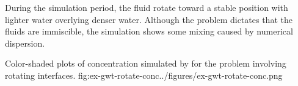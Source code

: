 During the simulation period, the fluid rotate toward a stable position with lighter water overlying denser water.  Although the problem dictates that the fluids are immiscible, the \mf simulation shows some mixing caused by numerical dispersion.

\begin{StandardFigure}{
                                     Color-shaded plots of concentration simulated by \mf for the \cite{bakker2004} problem involving rotating interfaces.
                                     }{fig:ex-gwt-rotate-conc}{../figures/ex-gwt-rotate-conc.png}
\end{StandardFigure}                                 

